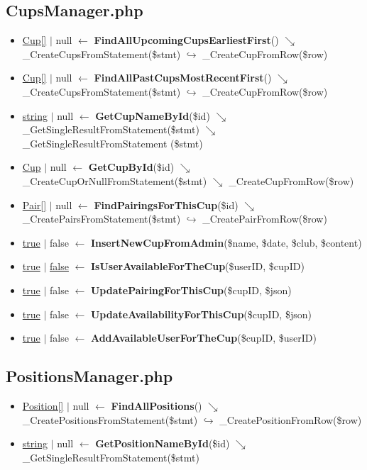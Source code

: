 \subsection{CupsManager.php}
\begin{itemize}
  \setlength\itemsep{0em}
  \item \underline{Cup[]} $\vert$ null $\leftarrow$ \textbf{FindAllUpcomingCupsEarliestFirst}() $\searrow$ \_CreateCupsFromStatement(\$stmt) $\hookrightarrow$ \_CreateCupFromRow(\$row)
  \item \underline{Cup[]} $\vert$ null $\leftarrow$ \textbf{FindAllPastCupsMostRecentFirst}() $\searrow$ \_CreateCupsFromStatement(\$stmt) $\hookrightarrow$ \_CreateCupFromRow(\$row)
  \item \underline{string} $\vert$ null  $\leftarrow$ \textbf{GetCupNameById}(\$id) $\searrow$ \_GetSingleResultFromStatement(\$stmt) $\searrow$ \_GetSingleResultFromStatement (\$stmt)
  \item \underline{Cup} $\vert$ null  $\leftarrow$  \textbf{GetCupById}(\$id) $\searrow$ \_CreateCupOrNullFromStatement(\$stmt)  $\searrow$ \_CreateCupFromRow(\$row)
  \item \underline{Pair[]} $\vert$ null $\leftarrow$  \textbf{FindPairingsForThisCup}(\$id) $\searrow$ \_CreatePairsFromStatement(\$stmt) $\hookrightarrow$ \_CreatePairFromRow(\$row)
  \item \underline{true} $\vert$ false $\leftarrow$  \textbf{InsertNewCupFromAdmin}(\$name, \$date, \$club, \$content)
  \item \underline{true} $\vert$ \underline{false} $\leftarrow$  \textbf{IsUserAvailableForTheCup}(\$userID, \$cupID)
  \item \underline{true} $\vert$ false $\leftarrow$  \textbf{UpdatePairingForThisCup}(\$cupID, \$json)
  \item \underline{true} $\vert$ false $\leftarrow$  \textbf{UpdateAvailabilityForThisCup}(\$cupID, \$json)
  \item \underline{true} $\vert$ false $\leftarrow$  \textbf{AddAvailableUserForTheCup}(\$cupID, \$userID)
\end{itemize}
\subsection{PositionsManager.php}
\begin{itemize}
  \setlength\itemsep{0em}
  \item \underline{Position[]} $\vert$ null $\leftarrow$  \textbf{FindAllPositions}() $\searrow$ \_CreatePositionsFromStatement(\$stmt) $\hookrightarrow$ \_CreatePositionFromRow(\$row)
  \item \underline{string} $\vert$ null $\leftarrow$ \textbf{GetPositionNameById}(\$id) $\searrow$ \_GetSingleResultFromStatement(\$stmt)
\end{itemize}
